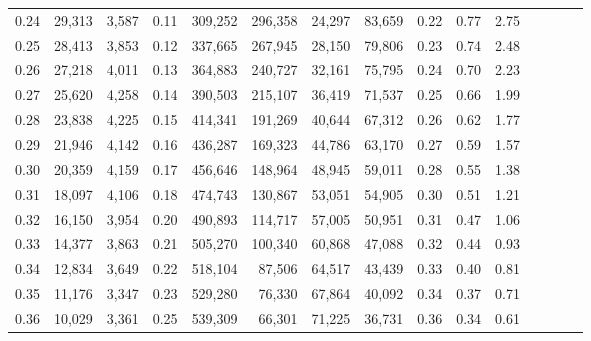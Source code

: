 \begin{tabular}{rrrcrrrrrrrrrrr}
0.24 &  29,313 &  3,587 &                                       0.11 &  309,252 &  296,358 &   24,297 &   83,659 &  0.22 &  0.77 &                         2.75 \\
0.25 &  28,413 &  3,853 &                                       0.12 &  337,665 &  267,945 &   28,150 &   79,806 &  0.23 &  0.74 &                         2.48 \\
0.26 &  27,218 &  4,011 &                                       0.13 &  364,883 &  240,727 &   32,161 &   75,795 &  0.24 &  0.70 &                         2.23 \\
0.27 &  25,620 &  4,258 &                                       0.14 &  390,503 &  215,107 &   36,419 &   71,537 &  0.25 &  0.66 &                         1.99 \\
0.28 &  23,838 &  4,225 &                                       0.15 &  414,341 &  191,269 &   40,644 &   67,312 &  0.26 &  0.62 &                         1.77 \\
0.29 &  21,946 &  4,142 &                                       0.16 &  436,287 &  169,323 &   44,786 &   63,170 &  0.27 &  0.59 &                         1.57 \\
0.30 &  20,359 &  4,159 &                                       0.17 &  456,646 &  148,964 &   48,945 &   59,011 &  0.28 &  0.55 &                         1.38 \\
0.31 &  18,097 &  4,106 &                                       0.18 &  474,743 &  130,867 &   53,051 &   54,905 &  0.30 &  0.51 &                         1.21 \\
0.32 &  16,150 &  3,954 &                                       0.20 &  490,893 &  114,717 &   57,005 &   50,951 &  0.31 &  0.47 &                         1.06 \\
0.33 &  14,377 &  3,863 &                                       0.21 &  505,270 &  100,340 &   60,868 &   47,088 &  0.32 &  0.44 &                         0.93 \\
0.34 &  12,834 &  3,649 &                                       0.22 &  518,104 &   87,506 &   64,517 &   43,439 &  0.33 &  0.40 &                         0.81 \\
0.35 &  11,176 &  3,347 &                                       0.23 &  529,280 &   76,330 &   67,864 &   40,092 &  0.34 &  0.37 &                         0.71 \\
0.36 &  10,029 &  3,361 &                                       0.25 &  539,309 &   66,301 &   71,225 &   36,731 &  0.36 &  0.34 &                         0.61 \\

\end{tabular}
